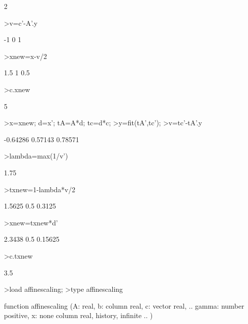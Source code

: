\documentclass[a4paper,10pt]{article}
\begin{document}
\begin{eulernotebook}
\begin{eulercomment}
\begin{eulercomment}
\begin{euleroutput}
  2
\end{euleroutput}
\begin{eulerprompt}
>v=c'-A'.y
\end{eulerprompt}
\begin{euleroutput}
         -1 
          0 
          1 
\end{euleroutput}
\begin{eulerprompt}
>xnew=x-v/2
\end{eulerprompt}
\begin{euleroutput}
        1.5 
          1 
        0.5 
\end{euleroutput}
\begin{eulerprompt}
>c.xnew
\end{eulerprompt}
\begin{euleroutput}
  5
\end{euleroutput}
\begin{eulerprompt}
>x=xnew; d=x'; tA=A*d; tc=d*c;
>y=fit(tA',tc');
>v=tc'-tA'.y
\end{eulerprompt}
\begin{euleroutput}
   -0.64286 
    0.57143 
    0.78571 
\end{euleroutput}
\begin{eulerprompt}
>lambda=max(1/v')
\end{eulerprompt}
\begin{euleroutput}
  1.75
\end{euleroutput}
\begin{eulerprompt}
>txnew=1-lambda*v/2
\end{eulerprompt}
\begin{euleroutput}
     1.5625 
        0.5 
     0.3125 
\end{euleroutput}
\begin{eulerprompt}
>xnew=txnew*d'
\end{eulerprompt}
\begin{euleroutput}
     2.3438 
        0.5 
    0.15625 
\end{euleroutput}
\begin{eulerprompt}
>c.txnew
\end{eulerprompt}
\begin{euleroutput}
  3.5
\end{euleroutput}
\begin{eulerprompt}
>load affinescaling;
>type affinescaling
\end{eulerprompt}
\begin{euleroutput}
  function affinescaling (A: real, b: column real, c: vector real,  ..
  gamma: number positive, x: none column real, history, infinite ..
  )
  

\end{euleroutput}
\end{eulercomment}
\end{eulercomment}
\end{eulernotebook}
\end{document}

